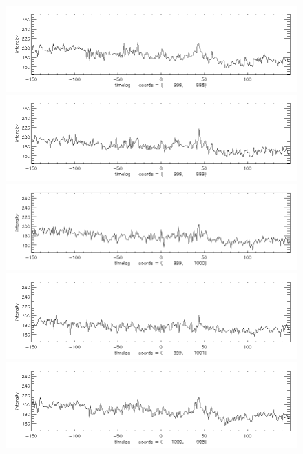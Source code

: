 \documentclass[12pt]{article}
\begin{document}
\begin{figure}[here]
\includegraphics[width=7in]{lc11.png}
\includegraphics[width=7in]{lc12.png}
\includegraphics[width=7in]{lc13.png}
\includegraphics[width=7in]{lc14.png}
\includegraphics[width=7in]{lc15.png}
\end{figure}
\newpage
\end{document}
